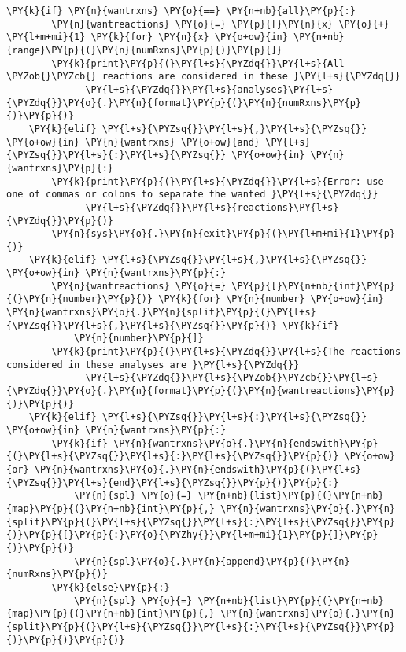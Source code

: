 \begin{Verbatim}[commandchars=\\\{\}]
    \PY{k}{if} \PY{n}{wantrxns} \PY{o}{==} \PY{n+nb}{all}\PY{p}{:}
        \PY{n}{wantreactions} \PY{o}{=} \PY{p}{[}\PY{n}{x} \PY{o}{+} \PY{l+m+mi}{1} \PY{k}{for} \PY{n}{x} \PY{o+ow}{in} \PY{n+nb}{range}\PY{p}{(}\PY{n}{numRxns}\PY{p}{)}\PY{p}{]}
        \PY{k}{print}\PY{p}{(}\PY{l+s}{\PYZdq{}}\PY{l+s}{All \PYZob{}\PYZcb{} reactions are considered in these }\PY{l+s}{\PYZdq{}}
              \PY{l+s}{\PYZdq{}}\PY{l+s}{analyses}\PY{l+s}{\PYZdq{}}\PY{o}{.}\PY{n}{format}\PY{p}{(}\PY{n}{numRxns}\PY{p}{)}\PY{p}{)}
    \PY{k}{elif} \PY{l+s}{\PYZsq{}}\PY{l+s}{,}\PY{l+s}{\PYZsq{}} \PY{o+ow}{in} \PY{n}{wantrxns} \PY{o+ow}{and} \PY{l+s}{\PYZsq{}}\PY{l+s}{:}\PY{l+s}{\PYZsq{}} \PY{o+ow}{in} \PY{n}{wantrxns}\PY{p}{:}
        \PY{k}{print}\PY{p}{(}\PY{l+s}{\PYZdq{}}\PY{l+s}{Error: use one of commas or colons to separate the wanted }\PY{l+s}{\PYZdq{}}
              \PY{l+s}{\PYZdq{}}\PY{l+s}{reactions}\PY{l+s}{\PYZdq{}}\PY{p}{)}
        \PY{n}{sys}\PY{o}{.}\PY{n}{exit}\PY{p}{(}\PY{l+m+mi}{1}\PY{p}{)}
    \PY{k}{elif} \PY{l+s}{\PYZsq{}}\PY{l+s}{,}\PY{l+s}{\PYZsq{}} \PY{o+ow}{in} \PY{n}{wantrxns}\PY{p}{:}
        \PY{n}{wantreactions} \PY{o}{=} \PY{p}{[}\PY{n+nb}{int}\PY{p}{(}\PY{n}{number}\PY{p}{)} \PY{k}{for} \PY{n}{number} \PY{o+ow}{in} \PY{n}{wantrxns}\PY{o}{.}\PY{n}{split}\PY{p}{(}\PY{l+s}{\PYZsq{}}\PY{l+s}{,}\PY{l+s}{\PYZsq{}}\PY{p}{)} \PY{k}{if}
            \PY{n}{number}\PY{p}{]}
        \PY{k}{print}\PY{p}{(}\PY{l+s}{\PYZdq{}}\PY{l+s}{The reactions considered in these analyses are }\PY{l+s}{\PYZdq{}}
              \PY{l+s}{\PYZdq{}}\PY{l+s}{\PYZob{}\PYZcb{}}\PY{l+s}{\PYZdq{}}\PY{o}{.}\PY{n}{format}\PY{p}{(}\PY{n}{wantreactions}\PY{p}{)}\PY{p}{)}
    \PY{k}{elif} \PY{l+s}{\PYZsq{}}\PY{l+s}{:}\PY{l+s}{\PYZsq{}} \PY{o+ow}{in} \PY{n}{wantrxns}\PY{p}{:}
        \PY{k}{if} \PY{n}{wantrxns}\PY{o}{.}\PY{n}{endswith}\PY{p}{(}\PY{l+s}{\PYZsq{}}\PY{l+s}{:}\PY{l+s}{\PYZsq{}}\PY{p}{)} \PY{o+ow}{or} \PY{n}{wantrxns}\PY{o}{.}\PY{n}{endswith}\PY{p}{(}\PY{l+s}{\PYZsq{}}\PY{l+s}{end}\PY{l+s}{\PYZsq{}}\PY{p}{)}\PY{p}{:}
            \PY{n}{spl} \PY{o}{=} \PY{n+nb}{list}\PY{p}{(}\PY{n+nb}{map}\PY{p}{(}\PY{n+nb}{int}\PY{p}{,} \PY{n}{wantrxns}\PY{o}{.}\PY{n}{split}\PY{p}{(}\PY{l+s}{\PYZsq{}}\PY{l+s}{:}\PY{l+s}{\PYZsq{}}\PY{p}{)}\PY{p}{[}\PY{p}{:}\PY{o}{\PYZhy{}}\PY{l+m+mi}{1}\PY{p}{]}\PY{p}{)}\PY{p}{)}
            \PY{n}{spl}\PY{o}{.}\PY{n}{append}\PY{p}{(}\PY{n}{numRxns}\PY{p}{)}
        \PY{k}{else}\PY{p}{:}
            \PY{n}{spl} \PY{o}{=} \PY{n+nb}{list}\PY{p}{(}\PY{n+nb}{map}\PY{p}{(}\PY{n+nb}{int}\PY{p}{,} \PY{n}{wantrxns}\PY{o}{.}\PY{n}{split}\PY{p}{(}\PY{l+s}{\PYZsq{}}\PY{l+s}{:}\PY{l+s}{\PYZsq{}}\PY{p}{)}\PY{p}{)}\PY{p}{)}


\end{Verbatim}
